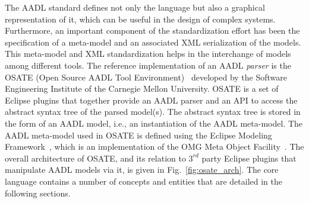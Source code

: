 The AADL standard defines not only the language but also a graphical
representation of it, which can be useful in the design of complex
systems. Furthermore, an important component of the standardization
effort has been the specification of a meta-model and an associated
XML serialization of the models. This meta-model and XML
standardization helps in the interchange of models among different
tools. The reference implementation of an AADL \emph{parser} is the
OSATE (Open Source AADL Tool Environment)~\cite{sei-osate} developed
by the Software Engineering Institute of the Carnegie Mellon
University. OSATE is a set of Eclipse plugins that together provide an
AADL parser and an API to access the abstract syntax tree of the
parsed model(s). The abstract syntax tree is stored in the form of an
AADL model, i.e., an instantiation of the AADL meta-model. The AADL
meta-model used in OSATE is defined using the Eclipse Modeling
Framework~\cite{budinsky-emf}, which is an implementation of the OMG
Meta Object Facility~\cite{mof-std}. The overall architecture of
OSATE, and its relation to $3^{rd}$ party Eclipse plugins that
manipulate AADL models via it, is given in Fig.~\ref{fig:osate_arch}.
The core language contains a number of concepts and entities that are
detailed in the following sections.

